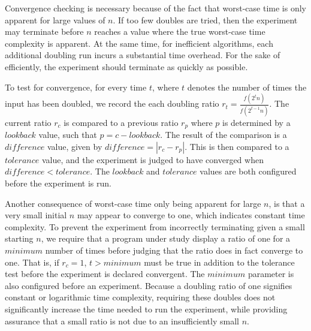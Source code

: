   Convergence checking is necessary because of the fact that worst-case time is only apparent for large values of $n$.
  If too few doubles are tried, then the experiment may terminate before $n$ reaches a value where the true worst-case
  time complexity is apparent. At the same time, for inefficient  algorithms, each additional doubling run incurs a
  substantial time overhead. For the sake of efficiently, the experiment should terminate as quickly as possible.


  To test for convergence, for every time $t$, where $t$ denotes the number of times the input has been doubled, we
  record the each doubling ratio $r_t = \frac{f(2^t n)}{f(2^{t-1}n)}$. The current ratio $r_c$ is compared to a previous
  ratio $r_p$ where $p$ is determined by a $\mathit{lookback}$ value, such that $p=c-\mathit{lookback}$.  The result of
  the comparison is a $\mathit{difference}$ value, given by $\mathit{difference} = |r_c - r_p|$.  This is then compared
  to a $\mathit{tolerance}$ value, and the experiment is judged to have converged when $\mathit{difference}<\mathit{tolerance}$.
  The $\mathit{lookback}$ and $\mathit{tolerance}$ values are both configured before the experiment is run.

  Another consequence of worst-case time only being apparent for large $n$, is that a very small initial $n$ may appear
  to converge to one, which indicates constant time complexity. To prevent the experiment from incorrectly terminating
  given a small starting $n$, we require that a program under study display a ratio of one for a $\mathit{minimum}$
  number of times before judging that the ratio does in fact converge to one.  That is, if $r_c = 1$, $t >
  \mathit{minimum}$ must be true in addition to the tolerance test before the experiment is declared convergent.  The
  $\mathit{minimum}$ parameter is also configured before an experiment.  Because a doubling ratio of one signifies
  constant or logarithmic time complexity, requiring these doubles does not significantly increase the time needed to
  run the experiment, while providing assurance that a small ratio is not due to an insufficiently small $n$.
